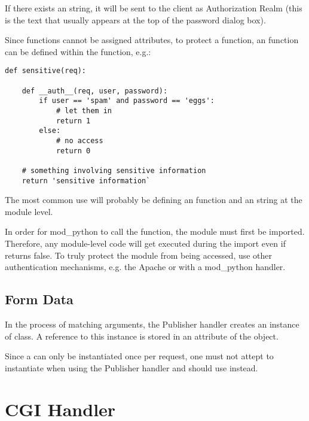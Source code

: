 If there exists an  string, it will be sent
to the client as Authorization Realm (this is the text that usually
appears at the top of the password dialog box).

Since functions cannot be assigned attributes, to protect a function,
an  function can be defined within the function, e.g.:

\begin{verbatim}
def sensitive(req):

    def __auth__(req, user, password):
        if user == 'spam' and password == 'eggs':
            # let them in
            return 1
        else:
            # no access
            return 0

    # something involving sensitive information
    return 'sensitive information`
\end{verbatim}

The most common use will probably be defining an 
function and an  string at the module level. 

 In order for mod_python to call the 
function, the module must first be imported. Therefore, any
module-level code will get executed during the import even if
 returns false.  To truly protect the module from
being accessed, use other authentication mechanisms, e.g. the Apache
 or with a mod_python  handler.

\subsection{Form Data}

In the process of matching arguments, the Publisher handler creates an
instance of 
class. A reference to this instance is stored in an attribute 
of the  object.

Since a  can only be instantiated once per
request, one must not attept to instantiate  when
using the Publisher handler and should use
 instead.

\section{CGI Handler\label{hand-cgi}}



